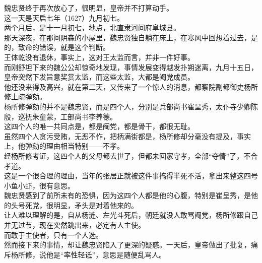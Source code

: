 \begin{multicols}{\theparacolNo}
魏忠贤终于再次放心了，很明显，皇帝并不打算动手。\\

这一天是天启七年（1627）九月初七。\\

两个月后，是十一月初七，地点，北直隶河间府阜城县。\\

那天深夜，在那间阴森的小屋里，魏忠贤独自躺在床上，在寒风中回想着过去，是的，致命的错误，就是这个判断。\\

王体乾没有退休，事实上，这对王太监而言，并非一件好事。\\

而刚舒坦下来的魏公公却惊奇地发现，事情发展变得越发扑朔迷离，九月十五日，皇帝突然下发旨意奖赏太监，而这些太监，大都是阉党成员。\\

他还没来得及高兴，就在第二天，又传来了一个惊人的消息，都察院副都御史杨所修上疏弹劾。\\

杨所修弹劾的并不是魏忠贤，而是四个人，分别是兵部尚书崔呈秀，太仆寺少卿陈殷，巡抚朱童蒙，工部尚书李养德。\\

这四个人的唯一共同点是，都是阉党，都是骨干，都很无耻。\\

虽然四个人贪污受贿，无恶不作，把柄满街都是，杨所修却分毫没有提及，事实上，他弹劾的理由相当特别——不孝。\\

经杨所修考证，这四个人的父母都去世了，但都未回家守孝，全部“夺情”了，不合孝道。\\

这是一个很合理的理由，当年的张居正就被这件事搞得半死不活，拿出来整这四号小鱼小虾，很有意思。\\

魏忠贤感到了前所未有的恐惧，因为这四个人都是他的心腹，特别是崔呈秀，是他的头号死党，很明显，矛头是对着他来的。\\

让人难以理解的是，自从杨涟、左光斗死后，朝廷就没人敢骂阉党，杨所修跟自己并无过节，现在突然跳出来，必定有人主使。\\

而敢于主使者，只有一个人选。\\

然而接下来的事情，却让魏忠贤陷入了更深的疑惑。一天后，皇帝做出了批复，痛斥杨所修，说他是“率性轻诋”，意思是随便乱骂人。\\


\end{multicols}
